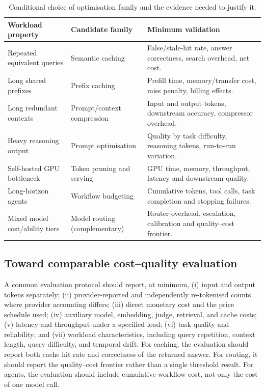 \IfFileExists{jair.cls}{\documentclass{jair}}{\documentclass[manuscript,nonacm,screen]{acmart}}
\begin{document}
\begin{table}[t]
\caption{Conditional choice of optimisation family and the evidence needed to justify it.}
\label{tab:decision}
\centering
\footnotesize
\begin{tabularx}{\textwidth}{@{}>{\RaggedRight\arraybackslash}p{} >{\RaggedRight\arraybackslash}p{} >{\RaggedRight\arraybackslash}X@{}}
\toprule Workload property & Candidate family & Minimum validation \\
\midrule
Repeated equivalent queries & Semantic caching & False/stale-hit rate, answer correctness, search overhead, net cost. \\
Long shared prefixes & Prefix caching & Prefill time, memory/transfer cost, miss penalty, billing effects. \\
Long redundant contexts & Prompt/context compression & Input and output tokens, downstream accuracy, compressor overhead. \\
Heavy reasoning output & Prompt optimisation & Quality by task difficulty, reasoning tokens, run-to-run variation. \\
Self-hosted GPU bottleneck & Token pruning and serving & GPU time, memory, throughput, latency and downstream quality. \\
Long-horizon agents & Workflow budgeting & Cumulative tokens, tool calls, task completion and stopping failures. \\
Mixed model cost/ability tiers & Model routing (complementary) & Router overhead, escalation, calibration and quality--cost frontier. \\
\bottomrule
\end{tabularx}
\end{table}

\subsection{Toward comparable cost--quality evaluation}

A common evaluation protocol should report, at minimum, (i) input and output tokens separately; (ii) provider-reported and independently re-tokenised counts where provider accounting differs; (iii) direct monetary cost and the price schedule used; (iv) auxiliary model, embedding, judge, retrieval, and cache costs; (v) latency and throughput under a specified load; (vi) task quality and reliability; and (vii) workload characteristics, including query repetition, context length, query difficulty, and temporal drift. For caching, the evaluation should report both cache hit rate and correctness of the returned answer. For routing, it should report the quality--cost frontier rather than a single threshold result. For agents, the evaluation should include cumulative workflow cost, not only the cost of one model call.
\end{document}
